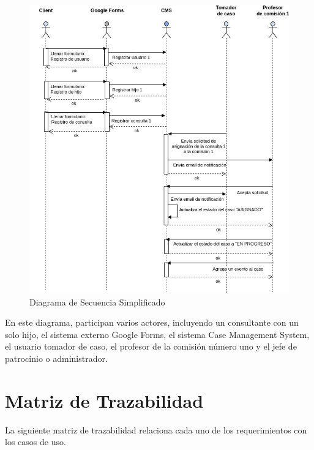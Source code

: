 \begin{figure}[H]
\centering
\includegraphics[width=1\linewidth]{fig/secuencia-basica.png}
\caption{Diagrama de Secuencia Simplificado}
\label{fig:secuencia-nominal}
\end{figure}
En este diagrama, participan varios actores, incluyendo un consultante con un solo hijo, el sistema externo Google Forms, el sistema Case Management System, el usuario tomador de caso, el profesor de la comisión número uno y el jefe de patrocinio o administrador.


\section{Matriz de Trazabilidad}
La siguiente matriz de trazabilidad relaciona cada uno de los requerimientos con los casos de uso.

